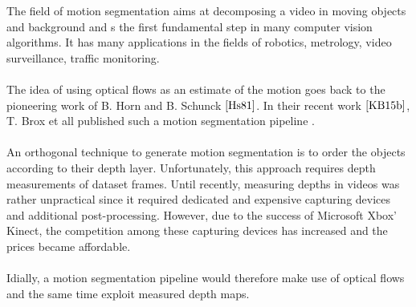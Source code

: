 The field of motion segmentation aims at decomposing a video in moving objects and background and s the first fundamental step in many computer vision algorithms. It has many applications in the fields of robotics, metrology, video surveillance, traffic monitoring. \\ \\
The idea of using optical flows as an estimate of the motion goes back to the pioneering work of B. Horn and B. Schunck $\cite{Hs81}$. In their recent work $\cite{KB15b}$, T. Brox et all published such a motion segmentation pipeline . \\ \\
An orthogonal technique to generate motion segmentation is to order the objects according to their depth layer. Unfortunately, this approach requires depth measurements of dataset frames. Until recently, measuring depths in videos was rather unpractical since it required dedicated and expensive capturing devices and additional post-processing. However, due to the success of Microsoft Xbox' Kinect, the competition among these capturing devices has increased and the prices became affordable. \\ \\
Idially, a motion segmentation pipeline would therefore make use of optical flows and the same time exploit measured depth maps. 

